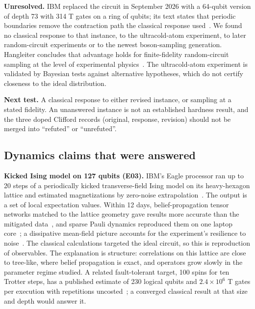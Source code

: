 \documentclass[10pt,a4paper]{article}
\begin{document}
\textbf{Unresolved.} IBM replaced the circuit in September 2026 with a 64-qubit version of depth 73 with 314 T gates on a ring of qubits; its text states that periodic boundaries remove the contraction path the classical response used~\cite{martiel2026}. We found no classical response to that instance, to the ultracold-atom experiment, to later random-circuit experiments or to the newest boson-sampling generation. Hangleiter concludes that advantage holds for finite-fidelity random-circuit sampling at the level of experimental physics~\cite{hangleiter2026}. The ultracold-atom experiment is validated by Bayesian tests against alternative hypotheses, which do not certify closeness to the ideal distribution.

\textbf{Next test.} A classical response to either revised instance, or sampling at a stated fidelity. An unanswered instance is not an established hardness result, and the three doped Clifford records (original, response, revision) should not be merged into ``refuted'' or ``unrefuted''.

\subsection{Dynamics claims that were answered}
\textbf{Kicked Ising model on 127 qubits (E03).} IBM's Eagle processor ran up to 20 steps of a periodically kicked transverse-field Ising model on its heavy-hexagon lattice and estimated magnetizations by zero-noise extrapolation~\cite{kim2023}. The output is a set of local expectation values. Within 12 days, belief-propagation tensor networks matched to the lattice geometry gave results more accurate than the mitigated data~\cite{tindall2024,aps2024}, and sparse Pauli dynamics reproduced them on one laptop core~\cite{begusic2023,begusic2024}; a dissipative mean-field picture accounts for the experiment's resilience to noise~\cite{dallatorre}. The classical calculations targeted the ideal circuit, so this is reproduction of observables. The explanation is structure: correlations on this lattice are close to tree-like, where belief propagation is exact, and operators grow slowly in the parameter regime studied. A related fault-tolerant target, 100 spins for ten Trotter steps, has a published estimate of 230 logical qubits and $2.4\times10^6$ T gates per execution with repetitions uncosted~\cite{beverland2022}; a converged classical result at that size and depth would answer it.
\end{document}
